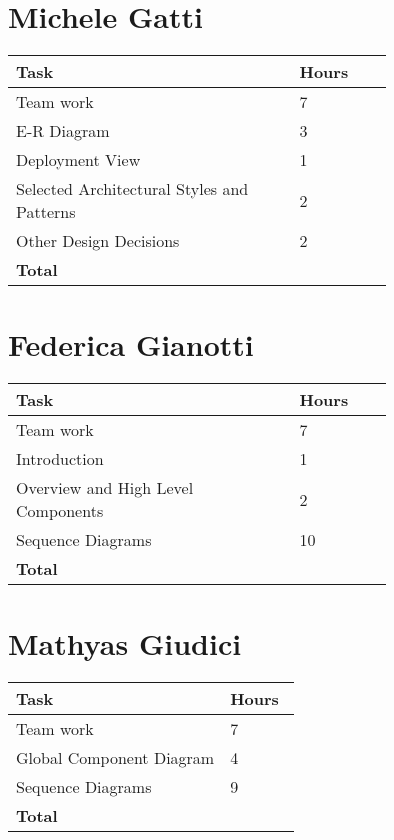\section{Michele Gatti}

\smallskip
\begin{center}
\begin{tabular}{ | p{0.75\linewidth} | l | }
  \hline
    \textbf{Task} & \textbf{Hours }\\ \hline
     Team work & 7 \\ \hline
     E-R Diagram & 3 \\ \hline
     Deployment View & 1 \\ \hline
     Selected Architectural Styles and Patterns & 2 \\ \hline
     Other Design Decisions & 2 \\ \hline
    \textbf{Total} & \textbf{} \\ \hline
\end{tabular}
\end{center}
\smallskip


\section{Federica Gianotti}

\smallskip
\begin{center}
\begin{tabular}{ | p{0.75\linewidth} | l | }
  \hline
    \textbf{Task} & \textbf{Hours }\\ \hline
    Team work & 7 \\ \hline
    Introduction & 1 \\ \hline
    Overview and High Level Components & 2 \\ \hline
    Sequence Diagrams & 10 \\ \hline
   \textbf{Total} & \textbf{} \\ \hline
\end{tabular}
\end{center}
\smallskip

\section{Mathyas Giudici}

\smallskip
\begin{center}
\begin{tabular}{ | p{0.75\linewidth} | l | }
  \hline
    \textbf{Task} & \textbf{Hours }\\ \hline
    Team work & 7 \\ \hline
    Global Component Diagram & 4 \\ \hline
    Sequence Diagrams & 9 \\ \hline
   \textbf{Total} & \textbf{} \\ \hline
\end{tabular}
\end{center}

\clearpage

